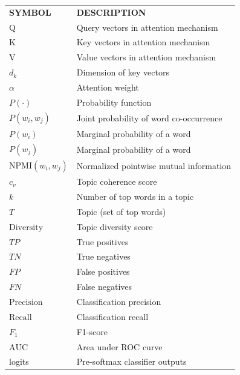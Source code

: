 \documentclass[12pt,oneside,openright,a4paper]{cpe-english-project}
\begin{document}
\listofsymbols
\begin{flushleft}
\begin{tabular}{@{}p{}p{}@{}}
\textbf{SYMBOL}  & \textbf{DESCRIPTION} \\[0.2cm]
Q & Query vectors in attention mechanism \\
K & Key vectors in attention mechanism \\
V & Value vectors in attention mechanism \\
$d_k$ & Dimension of key vectors \\
$\alpha$ & Attention weight \\
$P(\cdot)$ & Probability function \\
$P(w_i, w_j)$ & Joint probability of word co-occurrence \\
$P(w_i)$ & Marginal probability of a word \\
$P(w_j)$ & Marginal probability of a word \\
$\mathrm{NPMI}(w_i, w_j)$ & Normalized pointwise mutual information \\
$c_v$ & Topic coherence score \\
$k$ & Number of top words in a topic \\
$T$ & Topic (set of top words) \\
$\mathrm{Diversity}$ & Topic diversity score \\
$TP$ & True positives \\
$TN$ & True negatives \\
$FP$ & False positives \\
$FN$ & False negatives \\
$\mathrm{Precision}$ & Classification precision \\
$\mathrm{Recall}$ & Classification recall \\
$F_1$ & F1-score \\
$\mathrm{AUC}$ & Area under ROC curve \\
logits & Pre-softmax classifier outputs \\
\end{tabular}
\end{flushleft}
\end{document}
